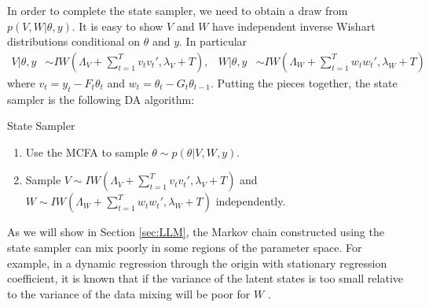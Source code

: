 \documentclass{article}
\begin{document}
In order to complete the state sampler, we need to obtain a draw from $p(V,W|\theta,y)$. It is easy to show $V$ and $W$ have independent inverse Wishart distributions conditional on $\theta$ and $y$. In particular
\begin{align*}
  V|\theta,y &\sim IW\left(\Lambda_V + \sum_{t=1}^Tv_tv_t',\lambda_V + T\right), &
  W|\theta,y &\sim IW\left(\Lambda_W + \sum_{t=1}^Tw_tw_t',\lambda_{W} + T\right) %
\end{align*}
where $v_t = y_t - F_t\theta_t$ and $w_t = \theta_t - G_t\theta_{t-1}$. Putting the pieces together, the state sampler is the following DA algorithm:
\begin{alg*}[State]State Sampler
\label{alg:DLMstate}
\begin{enumerate}
\item Use the MCFA to sample $\theta \sim p(\theta|V,W,y)$.
\item Sample $V \sim IW\left(\Lambda_V + \sum_{t=1}^Tv_tv_t',\lambda_V + T\right)$ and $W \sim IW\left(\Lambda_W + \sum_{t=1}^Tw_tw_t',\lambda_{W} + T\right)$ independently. 
\end{enumerate}
\end{alg*}
\noindent As we will show in Section \ref{sec:LLM}, the Markov chain constructed using the state sampler can mix poorly in some regions of the parameter space. For example, in a dynamic regression through the origin with stationary regression coefficient, it is known that if the variance of the latent states is too small relative to the variance of the data mixing will be poor for $W$ \cite{fruhwirth2004efficient}.
\end{document}
